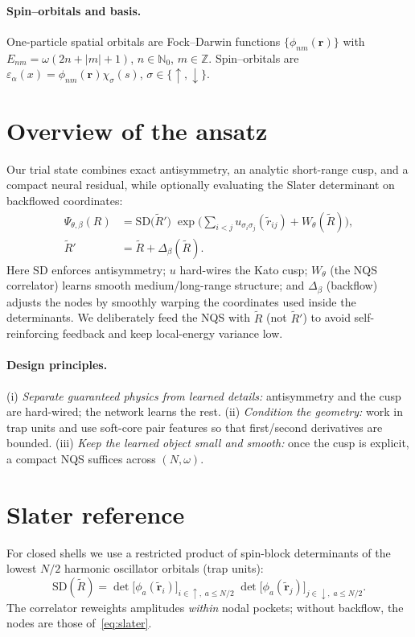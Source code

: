 \paragraph{Spin–orbitals and basis.}
One-particle spatial orbitals are Fock–Darwin functions $\{\phi_{nm}(\mathbf r)\}$ with
$E_{nm}=\omega(2n+|m|+1)$, $n\in\mathbb N_0$, $m\in\mathbb Z$. Spin–orbitals are
$\varepsilon_\alpha(x)=\phi_{nm}(\mathbf r)\chi_\sigma(s)$, $\sigma\in\{\uparrow,\downarrow\}$.


\section{Overview of the ansatz}
\label{sec:ansatz}
Our trial state combines exact antisymmetry, an analytic short-range cusp, and a compact
neural residual, while optionally evaluating the Slater determinant on backflowed coordinates:
\begin{align}
  \Psi_{\theta,\beta}(R)
  &= \mathrm{SD}\big(\tilde{R}'\big)\;
     \exp\!\Big(
       \sum_{i<j} u_{\sigma_i \sigma_j}(\tilde r_{ij})
       + W_\theta(\tilde{R})
     \Big),\label{eq:ansatz-overall} \\
  \tilde{R}' &= \tilde{R} + \Delta_\beta(\tilde{R}).\label{eq:bf-coords}
\end{align}
Here $\mathrm{SD}$ enforces antisymmetry; $u$ hard-wires the Kato cusp; $W_\theta$ (the NQS correlator) learns smooth
medium/long-range structure; and $\Delta_\beta$ (backflow) adjusts the nodes by smoothly warping the coordinates used
inside the determinants. We deliberately feed the NQS with $\tilde{R}$ (not $\tilde{R}'$) to avoid self-reinforcing feedback
and keep local-energy variance low.

\paragraph{Design principles.}
(i) \emph{Separate guaranteed physics from learned details:} antisymmetry and the cusp are hard-wired; the network learns the rest.
(ii) \emph{Condition the geometry:} work in trap units and use soft-core pair features so that first/second derivatives are bounded.
(iii) \emph{Keep the learned object small and smooth:} once the cusp is explicit, a compact NQS suffices across $(N,\omega)$.

\section{Slater reference}
\label{subsec:slater}
For closed shells we use a restricted product of spin-block determinants of the lowest $N/2$ harmonic oscillator orbitals (trap units):
\begin{equation}
  \mathrm{SD}(\tilde{R})
  =
  \det\!\big[\phi_a(\tilde{\mathbf r}_i)\big]_{i\in\uparrow,\;a\le N/2}\;
  \det\!\big[\phi_a(\tilde{\mathbf r}_j)\big]_{j\in\downarrow,\;a\le N/2}.
  \label{eq:slater}
\end{equation}
The correlator reweights amplitudes \emph{within} nodal pockets; without backflow, the nodes are those of~\eqref{eq:slater}.


